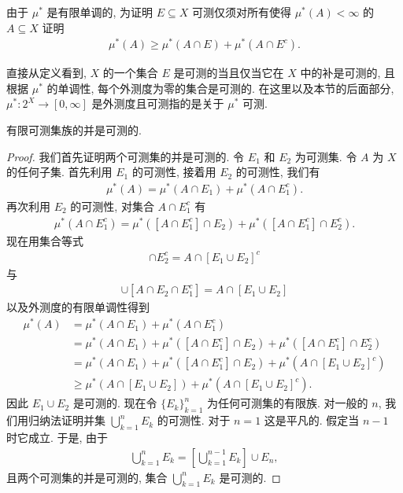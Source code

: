 \documentclass[../../main.tex]{subfiles}
\begin{document}
由于 $\mu^*$ 是有限单调的, 为证明 $E\subseteq X$ 可测仅须对所有使得 $\mu^*(A)<\infty$ 的 $A\subseteq X$ 证明
\begin{align*}
\mu^*(A)\geqslant\mu^*(A\cap E)+\mu^*(A\cap E^{c}).
\end{align*}

直接从定义看到, $X$ 的一个集合 $E$ 是可测的当且仅当它在 $X$ 中的补是可测的, 且根据 $\mu^*$ 的单调性, 每个外测度为零的集合是可测的. 在这里以及本节的后面部分, $\mu^*:2^{X}\to[0,\infty]$ 是外测度且可测指的是关于 $\mu^*$ 可测.

\begin{proposition}\label{proposition:ch17-finite-union-measurable}
有限可测集族的并是可测的.
\end{proposition}

\begin{proof}
我们首先证明两个可测集的并是可测的. 令 $E_{1}$ 和 $E_{2}$ 为可测集. 令 $A$ 为 $X$ 的任何子集. 首先利用 $E_{1}$ 的可测性, 接着用 $E_{2}$ 的可测性, 我们有
\begin{align*}
\mu^*(A)=\mu^*(A\cap E_{1})+\mu^*(A\cap E_{1}^{c}).
\end{align*}
再次利用 $E_{2}$ 的可测性, 对集合 $A\cap E_{1}^{c}$ 有
\begin{align*}
\mu^*(A\cap E_{1}^{c})=\mu^*([A\cap E_{1}^{c}]\cap E_{2})+\mu^*([A\cap E_{1}^{c}]\cap E_{2}^{c}).
\end{align*}
现在用集合等式
\begin{align*}
[A\cap E_{1}^{c}]\cap E_{2}^{c}=A\cap[E_{1}\cup E_{2}]^{c}
\end{align*}
与
\begin{align*}
[A\cap E_{1}]\cup[A\cap E_{2}\cap E_{1}^{c}]=A\cap[E_{1}\cup E_{2}]
\end{align*}
以及外测度的有限单调性得到
\begin{align*}
\mu^*(A)&=\mu^*(A\cap E_{1})+\mu^*(A\cap E_{1}^{c})\\
&=\mu^*(A\cap E_{1})+\mu^*([A\cap E_{1}^{c}]\cap E_{2})+\mu^*([A\cap E_{1}^{c}]\cap E_{2}^{c})\\
&=\mu^*(A\cap E_{1})+\mu^*([A\cap E_{1}^{c}]\cap E_{2})+\mu^*(A\cap[E_{1}\cup E_{2}]^{c})\\
&\geqslant\mu^*(A\cap[E_{1}\cup E_{2}])+\mu^*(A\cap[E_{1}\cup E_{2}]^{c}).
\end{align*}
因此 $E_{1}\cup E_{2}$ 是可测的. 现在令 $\{E_{k}\}_{k=1}^{n}$ 为任何可测集的有限族. 对一般的 $n$, 我们用归纳法证明并集 $\bigcup_{k=1}^{n}E_{k}$ 的可测性. 对于 $n=1$ 这是平凡的. 假定当 $n-1$ 时它成立. 于是, 由于
\begin{align*}
\bigcup_{k=1}^{n}E_{k}=\left[\bigcup_{k=1}^{n-1}E_{k}\right]\cup E_{n},
\end{align*}
且两个可测集的并是可测的, 集合 $\bigcup_{k=1}^{n}E_{k}$ 是可测的.
\end{proof}
\end{document}

